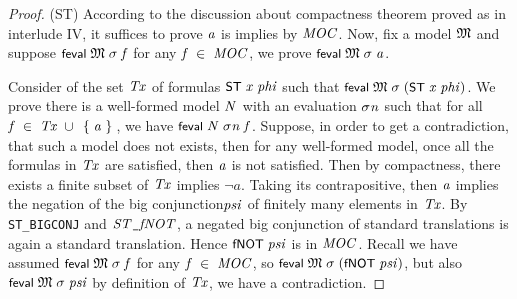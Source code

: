 \documentclass[letterpaper]{article}
\renewcommand{\HOLConst}[1]{{\textsf{\upshape\small #1}}}
\renewcommand{\HOLinline}[1]{\ensuremath{#1}}
\begin{document}
\begin{proof}
{\;\;\;\;\;\;\;\;\;\HOLConst{feval}\;\;\HOLBoundVar{\ensuremath{\sigma}}\;(\HOLConst{ST}\;\;)\HOLTokenRightbrace{}}
According to the discussion about compactness theorem proved as in interlude IV, it suffices to prove \HOLinline{\HOLFreeVar{a}} is implies by \HOLinline{\HOLFreeVar{MOC}}. Now, fix a model \HOLinline{\HOLFreeVar{\ensuremath{\mathfrak{M}}}} and suppose \HOLinline{\HOLConst{feval}\;\HOLFreeVar{\ensuremath{\mathfrak{M}}}\;\HOLFreeVar{\ensuremath{\sigma}}\;\HOLFreeVar{f}} for any \HOLinline{\HOLFreeVar{f}\;\HOLSymConst{\HOLTokenIn{}}\;\HOLFreeVar{MOC}}, we prove \HOLinline{\HOLConst{feval}\;\HOLFreeVar{\ensuremath{\mathfrak{M}}}\;\HOLFreeVar{\ensuremath{\sigma}}\;\HOLFreeVar{a}}. 

Consider of the set \HOLinline{\HOLFreeVar{Tx}} of formulas \HOLinline{\HOLConst{ST}\;\HOLFreeVar{x}\;\HOLFreeVar{phi}} such that \HOLinline{\HOLConst{feval}\;\HOLFreeVar{\ensuremath{\mathfrak{M}}}\;\HOLFreeVar{\ensuremath{\sigma}}\;(\HOLConst{ST}\;\HOLFreeVar{x}\;\HOLFreeVar{phi})}. We prove there is a well-formed model \HOLinline{\HOLFreeVar{N}} with an evaluation \HOLinline{\HOLFreeVar{\ensuremath{\sigma}n}} such that for all \HOLinline{\HOLFreeVar{f}\;\HOLSymConst{\HOLTokenIn{}}\;\HOLFreeVar{Tx}\;\HOLSymConst{\HOLTokenUnion{}}\;\HOLTokenLeftbrace{}\HOLFreeVar{a}\HOLTokenRightbrace{}}, we have \HOLinline{\HOLConst{feval}\;\HOLFreeVar{N}\;\HOLFreeVar{\ensuremath{\sigma}n}\;\HOLFreeVar{f}}. 
Suppose, in order to get a contradiction, that such a model does not exists, then for any well-formed model, once all the formulas in \HOLinline{\HOLFreeVar{Tx}} are satisfied, then \HOLinline{\HOLFreeVar{a}} is not satisfied. Then by compactness, there exists a finite subset of \HOLinline{\HOLFreeVar{Tx}} implies $\lnot a$. Taking its contrapositive, then \HOLinline{\HOLFreeVar{a}} implies the negation of the big conjunction\HOLinline{\HOLFreeVar{psi}} of finitely many elements in \HOLinline{\HOLFreeVar{Tx}}. By \texttt{ST_BIGCONJ} and \HOLinline{\HOLFreeVar{ST\HOLTokenUnderscore{}fNOT}}, a negated big conjunction of standard translations is again a standard translation. Hence \HOLinline{\HOLConst{fNOT}\;\HOLFreeVar{psi}} is in \HOLinline{\HOLFreeVar{MOC}}. Recall we have assumed \HOLinline{\HOLConst{feval}\;\HOLFreeVar{\ensuremath{\mathfrak{M}}}\;\HOLFreeVar{\ensuremath{\sigma}}\;\HOLFreeVar{f}} for any \HOLinline{\HOLFreeVar{f}\;\HOLSymConst{\HOLTokenIn{}}\;\HOLFreeVar{MOC}}, so \HOLinline{\HOLConst{feval}\;\HOLFreeVar{\ensuremath{\mathfrak{M}}}\;\HOLFreeVar{\ensuremath{\sigma}}\;(\HOLConst{fNOT}\;\HOLFreeVar{psi})}, but also \HOLinline{\HOLConst{feval}\;\HOLFreeVar{\ensuremath{\mathfrak{M}}}\;\HOLFreeVar{\ensuremath{\sigma}}\;\HOLFreeVar{psi}} by definition of \HOLinline{\HOLFreeVar{Tx}}, we have a contradiction. 


\end{proof}
\end{document}
